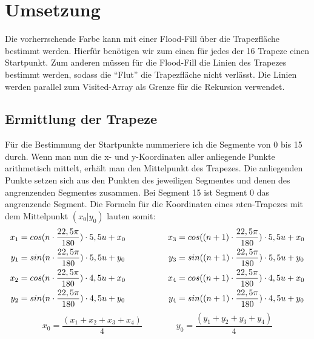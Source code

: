 \section{Umsetzung}
	Die vorherrschende Farbe kann mit einer Flood-Fill über die Trapezfläche bestimmt werden. Hierfür benötigen wir zum einen für jedes der 16 Trapeze einen Startpunkt. Zum anderen müssen für die Flood-Fill die Linien des Trapezes bestimmt werden, sodass die "`Flut"' die Trapezfläche nicht verlässt. Die Linien werden parallel zum Visited-Array als Grenze für die Rekursion verwendet.

\subsection{Ermittlung der Trapeze}
	Für die Bestimmung der Startpunkte nummeriere ich die Segmente von 0 bis 15 durch. Wenn man nun die x- und y-Koordinaten aller anliegende Punkte arithmetisch mittelt, erhält man den Mittelpunkt des Trapezes. Die anliegenden Punkte setzen sich aus den Punkten des jeweiligen Segmentes und denen des angrenzenden Segmentes zusammen. Bei Segment 15 ist Segment 0 das angrenzende Segment. Die Formeln für die Koordinaten eines \textit{n}ten-Trapezes mit dem Mittelpunkt \((x_0|y_0)\) lauten somit:
\begin{gather}
	\begin{split}
		x_1 &= cos(n \cdot \frac{22,5\pi}{180}) \cdot 5,5u + x_0\\
		y_1 &= sin(n \cdot \frac{22,5\pi}{180}) \cdot 5,5u + y_0\\ \vspace{2em}
		x_2 &= cos(n \cdot \frac{22,5\pi}{180}) \cdot 4,5u + x_0\\
		y_2 &= sin(n \cdot \frac{22,5\pi}{180}) \cdot 4,5u + y_0
	\end{split}
	\hspace{5em}
	\begin{split}
		x_3 &= cos((n+1) \cdot \frac{22,5\pi}{180}) \cdot 5,5u + x_0\\
		y_3 &= sin((n+1) \cdot \frac{22,5\pi}{180}) \cdot 5,5u + y_0 \\ \vspace{2em}
		x_4 &= cos((n+1) \cdot \frac{22,5\pi}{180}) \cdot 4,5u + x_0\\
		y_4 &= sin((n+1) \cdot \frac{22,5\pi}{180}) \cdot 4,5u + y_0
	\end{split} \label{eq:nKoords}
\end{gather}
\begin{equation}
	x_0 = \frac{(x_1+x_2+x_3+x_4)}{4} \hspace{4em} y_0 = \frac{(y_1+y_2+y_3+y_4)}{4}
\end{equation}
